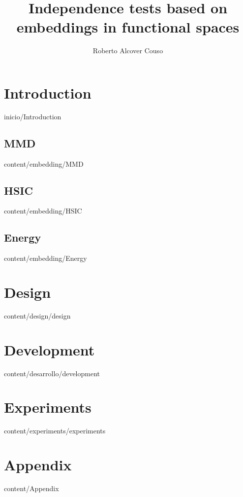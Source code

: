 \documentclass[epsbased,copyright,final,english,printable,covers,extendedindex,firstnumbered,tfg,gnuplot]{tfgtfmthesisuam}
\title[Independence tests]{Independence tests based on embeddings in functional spaces}
\author{Roberto Alcover Couso}
\begin{document}
\chapter{Introduction\label{CAP:INTRODUCCION}}{inicio/Introduction}
	\section{MMD\label{SEC:MMD}}{content/embedding/MMD}
	\section{HSIC\label{SEC:HSIC}}{content/embedding/HSIC}
	\section{Energy\label{SEC:Energy}}{content/embedding/Energy}
\chapter{Design\label{CAP:DEV}}{content/design/design}
\chapter{Development\label{CAP:DEVPMT}}{content/desarrollo/development}
\chapter{Experiments\label{Cap:Experiments}}{content/experiments/experiments}
\chapter{Appendix\label{Appendix}}{content/Appendix}
\end{document}
